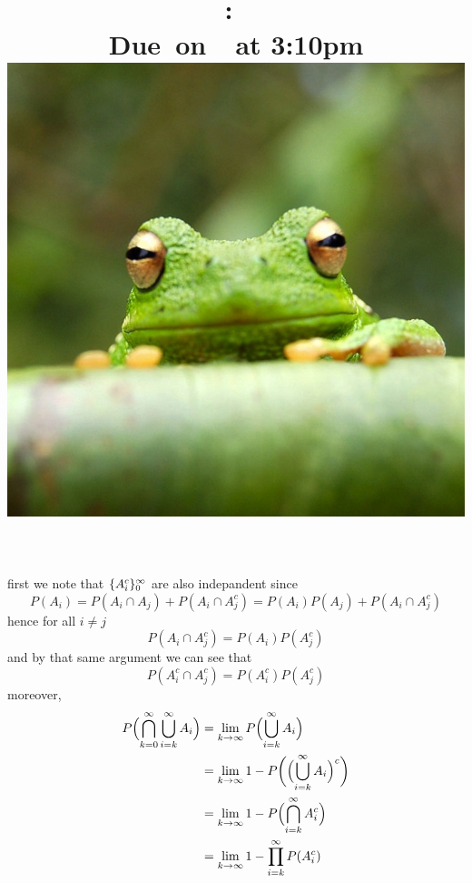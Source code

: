 \documentclass{article}
\title{
    \vspace{2in}
    \textmd{\textbf{\hmwkClass:\ \hmwkTitle}}\\
    \normalsize\vspace{0.1in}\small{Due\ on\ \hmwkDueDate\ at 3:10pm}\\
    \includegraphics[scale=0.2]{frog} \\
    \vspace{0.1in}\large{\textit{\hmwkClassTime}}
    \vspace{3in}
}
\author{\hmwkAuthorName}
\date{}
\begin{document}
first we note that $\{A_i^c\}_0^\infty$ are also indepandent since
\[P(A_i)=P(A_i\cap A_j)+P(A_i \cap A_j^c) = P(A_i)P(A_j)+P(A_i\cap A_j^c)\]
hence for all $i\neq j$
\[P(A_i\cap A_j^c)=P(A_i)P(A_j^c)\]
and by that same argument we can see that
\[P(A_i^c\cap A_j^c)=P(A_i^c)P(A_j^c)\]
moreover,
\begin{align*}
P\Bigl(\bigcap_{k=0}^\infty\bigcup_{i=k}^\infty A_i\Bigr) &= \lim_{k\to\infty}P\Bigl(\bigcup_{i=k}^\infty A_i\Bigr) \\
&= \lim_{k\to\infty}1-P\biggl(\Bigl(\bigcup_{i=k}^\infty A_i\Bigr)^c\biggr) \\
&= \lim_{k\to\infty}1-P\Bigl(\bigcap_{i=k}^\infty A_i^c\Bigr) \\
&= \lim_{k\to\infty}1-\prod_{i=k}^\infty P(A_i^c)
\end{align*}
\end{document}
